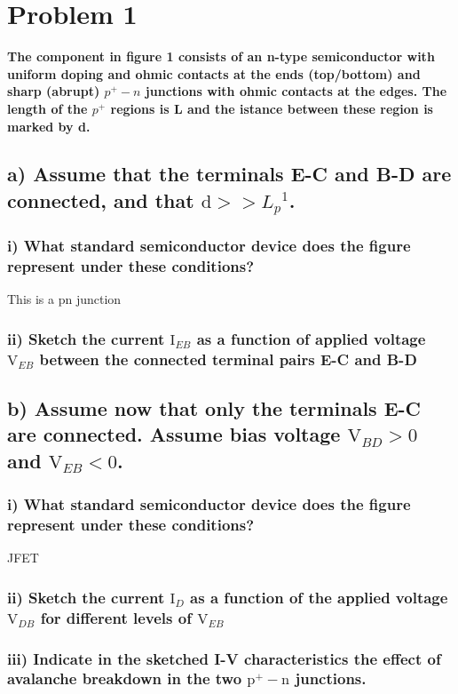 \section{Problem 1}
\textbf{The component in figure 1 consists of an n-type semiconductor with uniform doping and ohmic contacts at the ends (top/bottom) and sharp (abrupt) $p^+-n$ junctions with ohmic contacts at the edges. The length of the $p^+$ regions is L and the  istance between these region is marked by d.}
\subsection*{a) Assume that the terminals E-C and B-D are connected, and that $\mathrm{d}>>L_p{ }^1$.}

\subsubsection*{i) What standard semiconductor device does the figure represent under these conditions?}
This is a pn junction
\subsubsection*{ii) Sketch the current $\mathrm{I}_{E B}$ as a function of applied voltage $\mathrm{V}_{E B}$ between the connected terminal pairs E-C and B-D}
\subsection*{b) Assume now that only the terminals E-C are connected. Assume bias voltage $\mathrm{V}_{B D}>0$ and $\mathrm{V}_{E B}<0$.}
\subsubsection*{i) What standard semiconductor device does the figure represent under these conditions?}
JFET
\subsubsection*{ii) Sketch the current $\mathrm{I}_D$ as a function of the applied voltage $\mathrm{V}_{D B}$ for different levels of $\mathrm{V}_{E B}$}
\subsubsection*{iii) Indicate in the sketched I-V characteristics the effect of avalanche breakdown in the two $\mathrm{p}^{+}-\mathrm{n}$ junctions.}

